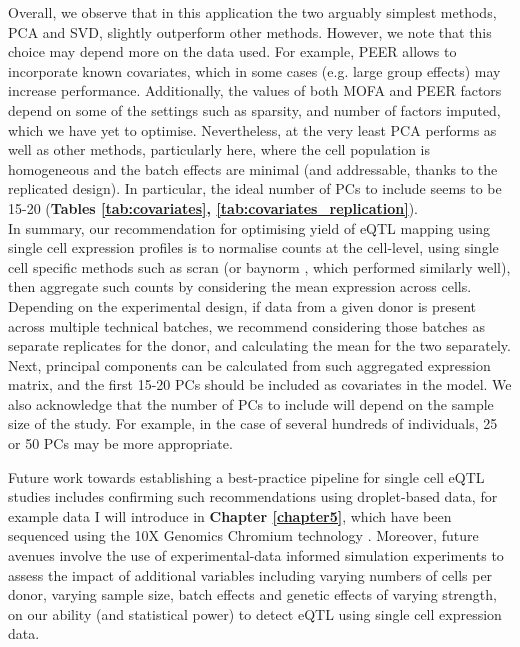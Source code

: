 Overall, we observe that in this application the two arguably simplest methods, PCA and SVD, slightly outperform other methods.
However, we note that this choice may depend more on the data used.
For example, PEER allows to incorporate known covariates, which in some cases (e.g. large group effects) may increase performance.
Additionally, the values of both MOFA and PEER factors depend on some of the settings such as sparsity, and number of factors imputed, which we have yet to optimise.
Nevertheless, at the very least PCA performs as well as other methods, particularly here, where the cell population is homogeneous and the batch effects are minimal (and addressable, thanks to the replicated design).
In particular, the ideal number of PCs to include seems to be 15-20 (\textbf{Tables \ref{tab:covariates}, \ref{tab:covariates_replication}}). 
\\

In summary, our recommendation for optimising yield of eQTL mapping using single cell expression profiles is to normalise counts at the cell-level, using single cell specific methods such as scran \cite{lun2016step}(or baynorm \cite{tang2020baynorm}, which performed similarly well), then aggregate such counts by considering the mean expression across cells.
Depending on the experimental design, if data from a given donor is present across multiple technical batches, we recommend considering those batches as separate replicates for the donor, and calculating the mean for the two separately.
Next, principal components can be calculated from such aggregated expression matrix, and the first 15-20 PCs should be included as covariates in the model.
We also acknowledge that the number of PCs to include will depend on the sample size of the study.
For example, in the case of several hundreds of individuals, 25 or 50 PCs may be more appropriate. 

\newpage

Future work towards establishing a best-practice pipeline for single cell eQTL studies includes confirming such recommendations using droplet-based data, for example data I will introduce in \textbf{Chapter 
\ref{chapter5}}, which have been sequenced using the 10X Genomics Chromium technology \cite{zheng2017massively}. 
Moreover, future avenues involve the use of experimental-data informed simulation experiments to assess the impact of additional variables including varying numbers of cells per donor, varying sample size, batch effects and genetic effects of varying strength, on our ability (and statistical power) to detect eQTL using single cell expression data.

